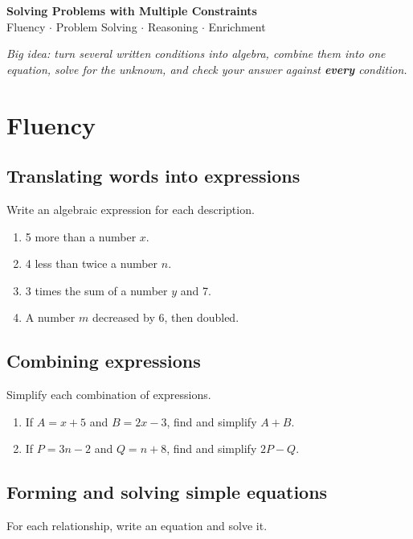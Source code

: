\documentclass[11pt]{article}
\newcommand{\worksheettitle}{Solving Problems with Multiple Constraints}
\newcommand{\qspace}{\vspace{1.0cm}}
\begin{document}
\begin{center}
  {\Large\bfseries \worksheettitle}\\[0.3em]
  {\normalsize Fluency \(\cdot\) Problem Solving \(\cdot\) Reasoning \(\cdot\) Enrichment}
\end{center}

\vspace{0.3em}
\noindent\textit{Big idea: turn several written conditions into algebra, combine them into one equation, solve for the unknown, and check your answer against \textbf{every} condition.}

\vspace{0.5em}

\section{Fluency}

\subsection*{Translating words into expressions}
Write an algebraic expression for each description.

\begin{enumerate}
  \item 5 more than a number $x$.
  \qspace
  \item 4 less than twice a number $n$.
  \qspace
  \item 3 times the sum of a number $y$ and 7.
  \qspace
  \item A number $m$ decreased by 6, then doubled.
  \qspace
\end{enumerate}

\subsection*{Combining expressions}
Simplify each combination of expressions.

\begin{enumerate}[resume]
  \item If $A = x + 5$ and $B = 2x - 3$, find and simplify $A + B$.
  \qspace
  \item If $P = 3n - 2$ and $Q = n + 8$, find and simplify $2P - Q$.
  \qspace
\end{enumerate}

\subsection*{Forming and solving simple equations}
For each relationship, write an equation and solve it.
\end{document}
